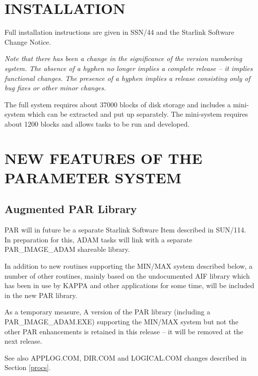 \newpage
  \setlength{\parskip}{0mm}
  \tableofcontents
  \setlength{\parskip}{\medskipamount}
  \markright{\stardocname}

\section{INSTALLATION}
Full installation instructions are given in SSN/44 and the Starlink Software
Change Notice.

{\em Note that there has been a change in the significance of the version
numbering system. The absence of a hyphen no longer implies a complete
release -- it implies functional changes.
The presence of a hyphen implies a release consisting only of bug fixes or
other minor changes.}

The full system requires about 37000 blocks of disk storage and includes a
mini-system which can be extracted and put up separately. The mini-system
requires about 1200 blocks and allows tasks to be run and  developed.


\section{NEW FEATURES OF THE PARAMETER SYSTEM}

\subsection{Augmented PAR Library}
PAR will in future be a separate Starlink Software Item described in
SUN/114.
In preparation for this, ADAM tasks will link with a separate
PAR\_IMAGE\_ADAM shareable library.

In addition to new routines supporting the MIN/MAX system described below,
a number of other routines, mainly based on the undocumented AIF library
which has been in use by KAPPA and other applications for some time, will
be included in the new PAR library.

As a temporary measure, A version of the PAR library (including a
PAR\_IMAGE\_ADAM.EXE) supporting the MIN/MAX system but not the other PAR
enhancements is retained in this release --
it will be removed at the next release.

See also APPLOG.COM, DIR.COM and LOGICAL.COM changes described in
Section \ref{procs}.

